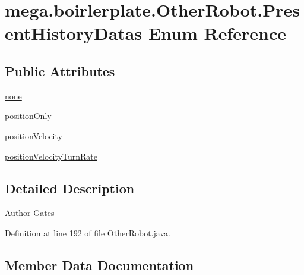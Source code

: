 \hypertarget{enummega_1_1boirlerplate_1_1_other_robot_1_1_present_history_datas}{}\section{mega.\+boirlerplate.\+Other\+Robot.\+Present\+History\+Datas Enum Reference}
\label{enummega_1_1boirlerplate_1_1_other_robot_1_1_present_history_datas}
\subsection*{Public Attributes}
\begin{DoxyCompactItemize}
\item 
\hyperlink{enummega_1_1boirlerplate_1_1_other_robot_1_1_present_history_datas_a8ddada05524af32249f4a38284dc0de8}{none}
\item 
\hyperlink{enummega_1_1boirlerplate_1_1_other_robot_1_1_present_history_datas_a544034ac971aa2d0cf7bdc94cf46beb3}{position\+Only}
\item 
\hyperlink{enummega_1_1boirlerplate_1_1_other_robot_1_1_present_history_datas_a7cddbdee9db912e4c07a584bcd7cc144}{position\+Velocity}
\item 
\hyperlink{enummega_1_1boirlerplate_1_1_other_robot_1_1_present_history_datas_ae96885748bb98009f6ad410778525bce}{position\+Velocity\+Turn\+Rate}
\end{DoxyCompactItemize}


\subsection{Detailed Description}
\begin{DoxyAuthor}{Author}
Gates 
\end{DoxyAuthor}


Definition at line 192 of file Other\+Robot.\+java.



\subsection{Member Data Documentation}
\mbox{\label{enummega_1_1boirlerplate_1_1_other_robot_1_1_present_history_datas_a8ddada05524af32249f4a38284dc0de8}} 
